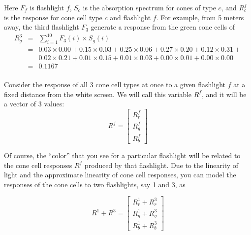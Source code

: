 \documentclass[10pt,letterpaper]{article}
\begin{document}
Here $F_f$ is flashlight $f$, $S_c$ is the absorption spectrum for cones of type $c$, and $R^f_c$ is the response for cone cell type $c$ and flashlight $f$. For example, from 5 meters away, the third flashlight $F_3$ generate a response from the green cone cells of\\
\begin{eqnarray*}
R^3_g &=& \sum_{i=1}^{10} F_3 (i) \times S_g(i) \\
&=& 0.03\times0.00 + 0.15\times0.03 + 0.25\times0.06 + 0.27\times0.20 + 0.12\times0.31 + \\ 
&~& 0.02\times0.21 + 0.01\times0.15 + 0.01\times0.03 + 0.00\times0.01 + 0.00\times0.00 \\
&=& 0.1167\\
\end{eqnarray*}

Consider the response of all 3 cone cell types at once to a given flashlight $f$
at a fixed distance from the white screen. We will call this variable $R^f$, and it will be a vector of 3 values:
\[
	R^f = \left[ \begin{array}{c}
				R^f_r \\
				R^f_g \\				
				R^f_b \end{array} \right]
\]

Of course, the “color” that you see for a particular flashlight will be related
to the cone cell responses $R^f$ produced by that flashlight. Due to the linearity
of light and the approximate linearity of cone cell responses, you can model the
responses of the cone cells to two flashlights, say 1 and 3, as

\[
	R^1 + R^3 = \left[ \begin{array}{c}
				R^1_r + R^3_r\\
				R^1_g + R^3_g\\				
				R^1_b + R^3_b\end{array} \right]
\]
\end{document}
